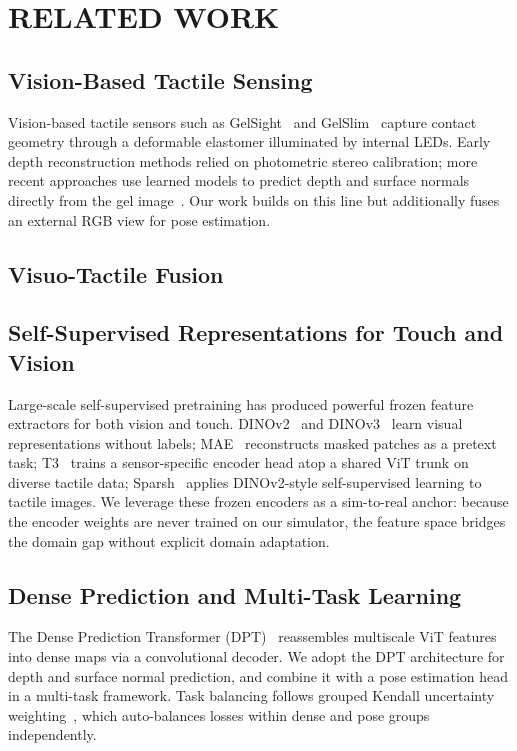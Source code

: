 \section{RELATED WORK}

\subsection{Vision-Based Tactile Sensing}
Vision-based tactile sensors such as GelSight~\cite{yuan2017gelsight} and
GelSlim~\cite{donlon2018gelslim} capture contact geometry through a
deformable elastomer illuminated by internal LEDs. Early depth reconstruction
methods relied on photometric stereo calibration; more recent approaches use
learned models to predict depth and surface normals directly from the gel
image~\cite{higuera2024sparsh}. Our work builds on this line but additionally
fuses an external RGB view for pose estimation.

\subsection{Visuo-Tactile Fusion}

\subsection{Self-Supervised Representations for Touch and Vision}
Large-scale self-supervised pretraining has produced powerful frozen feature
extractors for both vision and touch.
DINOv2~\cite{oquab2023dinov2} and DINOv3~\cite{simeoni2025dinov3} learn
visual representations without labels;
MAE~\cite{he2022mae} reconstructs masked patches as a pretext task;
T3~\cite{zhao2024transferable} trains a sensor-specific encoder head atop a
shared ViT trunk on diverse tactile data;
Sparsh~\cite{higuera2024sparsh} applies DINOv2-style self-supervised learning
to tactile images.
We leverage these frozen encoders as a sim-to-real anchor: because the encoder
weights are never trained on our simulator, the feature space bridges the
domain gap without explicit domain adaptation.

\subsection{Dense Prediction and Multi-Task Learning}
The Dense Prediction Transformer (DPT)~\cite{ranftl2021dpt} reassembles
multiscale ViT features into dense maps via a convolutional decoder. We adopt
the DPT architecture for depth and surface normal prediction, and combine it
with a pose estimation head in a multi-task framework. Task balancing follows
grouped Kendall uncertainty weighting~\cite{kendall2018multi}, which
auto-balances losses within dense and pose groups independently.

